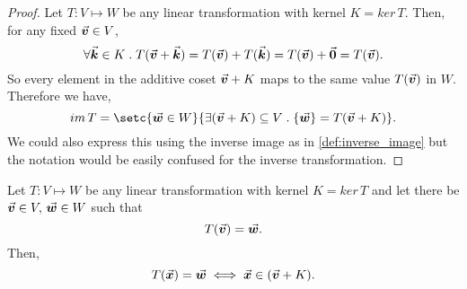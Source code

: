\documentclass[MathsNotesBase.tex]{subfiles}
\begin{document}
{		\medskip
		\begin{proof}
			Let ${ T: V \longmapsto W }$ be any linear transformation with kernel ${ K = ker\,T }$. Then, for any fixed ${ \vec{\bm{v}} \in V }$,
			\[ \forall \vec{\bm{k}} \in K \;.\; T(\vec{\bm{v}} + \vec{\bm{k}}) = T(\vec{\bm{v}}) + T(\vec{\bm{k}}) = T(\vec{\bm{v}}) + \vec{\bm{0}} = T(\vec{\bm{v}}). \]
			So every element in the additive coset ${ \vec{\bm{v}} + K }$ maps to the same value $T(\vec{\bm{v}})$ in $W$. Therefore we have,
			\[ im\,T = \setc{\w \in W}{\exists (\v + K) \subseteq V \logicsep \{\w\} = T(\v + K)}. \]
			We could also express this using the inverse image as in \ref{def:inverse_image} but the notation would be easily confused for the inverse transformation.
		\end{proof}
		\smallskip
		\begin{corollary}
			Let ${ T: V \longmapsto W }$ be any linear transformation with kernel ${ K = ker\,T }$ and let there be ${ \vec{\bm{v}} \in V,\, \vec{\bm{w}} \in W }$ such that 
				\[ T(\vec{\bm{v}}) = \vec{\bm{w}}. \] 
			Then,
				\[ T(\vec{\bm{x}}) = \vec{\bm{w}} \iff \vec{\bm{x}} \in (\vec{\bm{v}} + K). \]
		\end{corollary}
	
}
\end{document}
